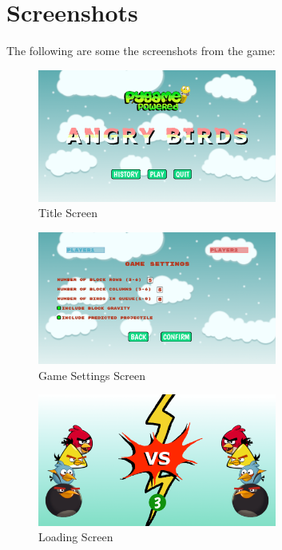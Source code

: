 \documentclass[12pt]{article}
\begin{document}
\section{Screenshots}
The following are some the screenshots from the game:
\begin{figure}[h!]
    \centering
    \includegraphics[width=0.7\textwidth]{ScreenShots/TitleScreen.png}
    \caption{Title Screen}
\end{figure}

\begin{figure}[h!]
    \centering
    \includegraphics[width=0.7\textwidth]{ScreenShots/GameSettings.png}
    \caption{Game Settings Screen}
\end{figure}

\begin{figure}[h!]
    \centering
    \includegraphics[width=0.7\textwidth]{ScreenShots/LoadingScreen.png}
    \caption{Loading Screen}
\end{figure}
\end{document}
